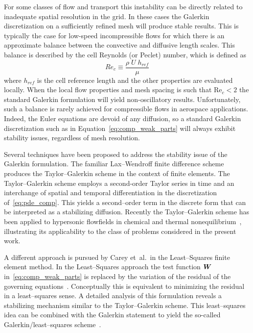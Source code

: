 For some classes of flow and transport this instability can be directly related to inadequate spatial resolution in the grid.  In these cases the Galerkin discretization on a sufficiently refined mesh will produce stable results.  This is typically the case for low-speed incompressible flows for which there is an approximate balance between the convective and diffusive length scales.  This balance is described by the cell Reynolds (or Peclet) number, which is defined as
\begin{equation}
  Re_c \equiv \frac{\rho\; U\; h_{ref}}{\mu}
  \label{eq:peclet}
\end{equation}
where $h_{ref}$ is the cell reference length and the other properties are evaluated locally.  When the local flow properties and mesh spacing is such that Re$_c < 2$ the standard Galerkin formulation will yield non-oscillatory results.  Unfortunately, such a balance is rarely achieved for compressible flows in aerospace applications.  Indeed, the Euler equations are devoid of any diffusion, so a standard Galerkin discretization such as in Equation~\eqref{eq:comp_weak_parts} will always exhibit stability issues, regardless of mesh resolution.

Several techniques have been proposed to address the stability issue of the Galerkin formulation.  The familiar Lax--Wendroff finite difference scheme produces the Taylor--Galerkin scheme in the context of finite elements.  The Taylor--Galerkin scheme employs a second-order Taylor series in time and an interchange of spatial and temporal differentiation in the discretization of~\eqref{eq:pde_comp}. This yields a second--order term in the discrete form that can be interpreted as a stabilizing diffusion.  Recently the Taylor--Galerkin scheme has been applied to hypersonic flowfields in chemical and thermal nonequilibrium~\cite{hypersonic_taylor_galerkin}, illustrating its applicability to the class of problems considered in the present work.

A different approach is pursued by Carey et~al.\ in the Least--Squares finite element method. In the Least--Squares approach the test function ${\boldsymbol{W}}$ in~\eqref{eq:comp_weak_parts} is replaced by the variation of the residual of the governing equations~\cite{carey_jiang,carey_jiang_euler}.  Conceptually this is equivalent to minimizing the residual in a least--squares sense.  A detailed analysis of this formulation reveals a stabilizing mechanism similar to the Taylor--Galerkin scheme.  This least--squares idea can be combined with the Galerkin statement to yield the so-called Galerkin/least--squares scheme~\cite{hughes_franca_hullbert_GLS}.


